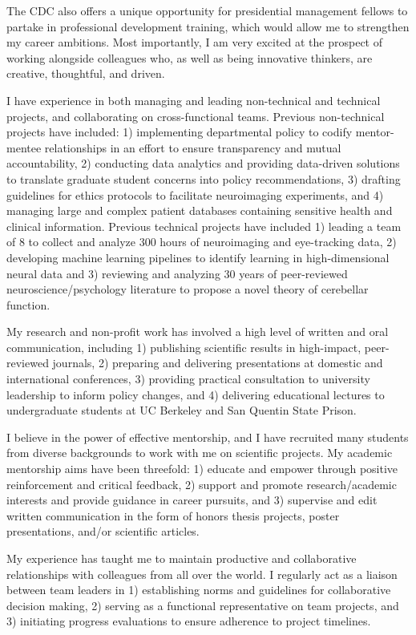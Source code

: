 \documentclass[11pt, a4paper]{maedbh-cv}
\begin{document}
\begin{cvletter}
The CDC also offers a unique opportunity for presidential management fellows to partake in professional development training, which would allow me to strengthen my career ambitions. Most importantly, I am very excited at the prospect of working alongside colleagues who, as well as being innovative thinkers, are creative, thoughtful, and driven. 

I have experience in both managing and leading non-technical and technical projects, and collaborating on cross-functional teams. Previous non-technical projects have included: 1) implementing departmental policy to codify mentor-mentee relationships in an effort to ensure transparency and mutual accountability, 2) conducting data analytics and providing data-driven solutions to translate graduate student concerns into policy recommendations, 3) drafting guidelines for ethics protocols to facilitate neuroimaging experiments, and 4) managing large and complex patient databases containing sensitive health and clinical information. Previous technical projects have included 1) leading a team of 8 to collect and analyze 300 hours of neuroimaging and eye-tracking data, 2) developing machine learning pipelines to identify learning in high-dimensional neural data and 3) reviewing and analyzing 30 years of peer-reviewed neuroscience/psychology literature to propose a novel theory of cerebellar function.

	My research and non-profit work has involved a high level of written and oral communication, including 1) publishing scientific results in high-impact, peer-reviewed journals, 2) preparing and delivering presentations at domestic and international conferences, 3) providing practical consultation to university leadership to inform policy changes, and 4) delivering educational lectures to undergraduate students at UC Berkeley and San Quentin State Prison. 

	I believe in the power of effective mentorship, and I have recruited many students from diverse backgrounds to work with me on scientific projects. My academic mentorship aims have been threefold: 1) educate and empower through positive reinforcement and critical feedback, 2) support and promote research/academic interests and provide guidance in career pursuits, and 3) supervise and edit written communication in the form of honors thesis projects, poster presentations, and/or scientific articles. 

	My experience has taught me to maintain productive and collaborative relationships with colleagues from all over the world. I regularly act as a liaison between team leaders in 1) establishing norms and guidelines for collaborative decision making, 2) serving as a functional representative on team projects, and 3) initiating progress evaluations to ensure adherence to project timelines.  


\end{cvletter}
\end{document}
